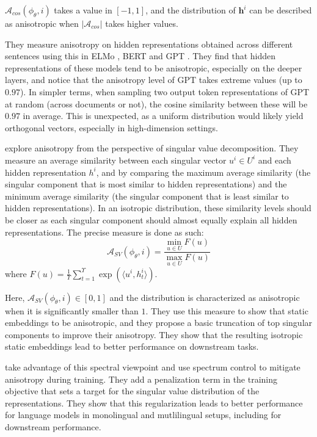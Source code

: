$\mathcal{A}_{cos}(\phi_\theta, i)$ takes a value in $[-1, 1]$, and the distribution of $\mathbf{h}^i$ can be described as anisotropic when $|\mathcal{A}_{cos}|$ takes higher values.

They measure anisotropy on hidden representations obtained across different sentences using this in ELMo \citep{peters-etal-2018-deep}, BERT \citep{devlin-etal-2019-bert} and GPT \citep{Radford2018ImprovingLU}. They find that hidden representations of these models tend to be anisotropic, especially on the deeper layers, and notice that the anisotropy level of GPT takes extreme values (up to $0.97$). In simpler terms, when sampling two output token representations of GPT at random (across documents or not), the cosine similarity between these will be $0.97$ in average. This is unexpected, as a uniform distribution would likely yield orthogonal vectors, especially in high-dimension settings.

\citet{mu2018allbutthetop} explore anisotropy from the perspective of singular value decomposition. They measure an average similarity between each singular vector $u^i \in U^i$ and each hidden representation $h^i$, and by comparing the maximum average similarity (the singular component that is most similar to hidden representations) and the minimum average similarity (the singular component that is least similar to hidden representations). In an isotropic distribution, these similarity levels should be closer as each singular component should almost equally explain all hidden representations. The precise measure is done as such:
$$
\mathcal{A}_{SV}(\phi_\theta, i) = \frac{\min_{u \in U} F(u)}{\max_{u \in U} F(u)}
$$
where $F(u) = \frac{1}{\Upsilon} \sum_{t=1}^{\Upsilon} \exp (\langle u^i, h^i_t\rangle)$.

Here, $\mathcal{A}_{SV}(\phi_\theta, i) \in [0, 1]$ and the distribution is characterized as anisotropic when it is significantly smaller than $1$. They use this measure to show that static embeddings to be anisotropic, and they propose a basic truncation of top singular components to improve their anisotropy. They show that the resulting isotropic static embeddings lead to better performance on downstream tasks.

\citet{Wang2020Improving} take advantage of this spectral viewpoint and use spectrum control to mitigate anisotropy during training. They add a penalization term in the training objective that sets a target for the singular value distribution of the representations. They show that this regularization leads to better performance for language models in monolingual and mutlilingual setups, including for downstream performance.

